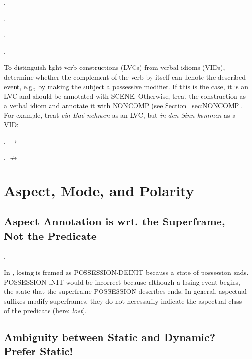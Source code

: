 \documentclass[a4paper]{article}
\newcommand{\fr}[1]{\textsf{#1}}
\begin{document}
\ex.

\ex.

\ex.

\ex.

To distinguish light verb constructions (LVCs) from verbal idioms (VIDs),
determine whether the complement of the verb by itself can denote the described
event, e.g., by making the subject a possessive modifier. If this is the case,
it is an LVC and should be annotated with \fr{SCENE}. Otherwise, treat the
construction as a verbal idiom and annotate it with \fr{NONCOMP} (see
Section~\ref{sec:NONCOMP}. For example, treat \emph{ein Bad nehmen} as an LVC,
but \emph{in den Sinn kommen} as a VID:

\ex. $\rightarrow$ 

\ex. $\nrightarrow$ 


\newpage\section{Aspect, Mode, and Polarity}

\subsection{Aspect Annotation is wrt. the Superframe, Not the Predicate}

\ex.

In \Last, losing is framed as \fr{POSSESSION-DEINIT} because a state of
possession ends. \fr{POSSESSION-INIT} would be incorrect because although a
losing event begins, the state that the superframe \fr{POSSESSION} describes
ends. In general, aspectual suffixes modify superframes, they do not
necessarily indicate the aspectual class of the predicate (here: \emph{lost}).


\newpage\subsection{Ambiguity between Static and Dynamic? Prefer Static!}
\end{document}
